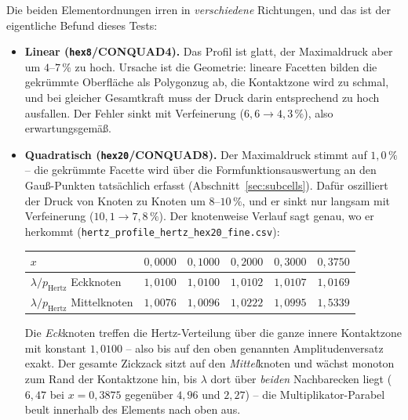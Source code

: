 \documentclass[a4paper,11pt]{article}
\newcommand{\code}[1]{\texttt{\small #1}}
\newcommand{\file}[1]{\texttt{\small #1}}
\begin{document}
\noindent Die beiden Elementordnungen irren in \emph{verschiedene} Richtungen, und das ist der
eigentliche Befund dieses Tests:

\begin{itemize}\itemsep2pt
  \item \textbf{Linear (\code{hex8}/CONQUAD4).} Das Profil ist glatt, der Maximaldruck aber um
        $4$--$7\,\%$ zu hoch. Ursache ist die Geometrie: lineare Facetten bilden die gekrümmte
        Oberfläche als Polygonzug ab, die Kontaktzone wird zu schmal, und bei gleicher Gesamtkraft
        muss der Druck darin entsprechend zu hoch ausfallen. Der Fehler sinkt mit Verfeinerung
        ($6{,}6\to4{,}3\,\%$), also erwartungsgemäß.
  \item \textbf{Quadratisch (\code{hex20}/CONQUAD8).} Der Maximaldruck stimmt auf $1{,}0\,\%$ --
        die gekrümmte Facette wird über die Formfunktionsauswertung an den Gauß-Punkten
        tatsächlich erfasst (Abschnitt~\ref{sec:subcells}). Dafür oszilliert der Druck von Knoten
        zu Knoten um $8$--$10\,\%$, und er sinkt nur langsam mit Verfeinerung
        ($10{,}1\to7{,}8\,\%$). Der knotenweise Verlauf sagt genau, wo er herkommt
        (\file{hertz\_profile\_hertz\_hex20\_fine.csv}):

        \begin{center}
        \small
        \begin{tabular}{lrrrrr}
        \toprule
        $x$ & $0{,}0000$ & $0{,}1000$ & $0{,}2000$ & $0{,}3000$ & $0{,}3750$ \\
        \midrule
        $\lambda/p_{\text{Hertz}}$ Eckknoten   & $1{,}0100$ & $1{,}0100$ & $1{,}0102$ & $1{,}0107$ & $1{,}0169$ \\
        $\lambda/p_{\text{Hertz}}$ Mittelknoten & $1{,}0076$ & $1{,}0096$ & $1{,}0222$ & $1{,}0995$ & $1{,}5339$ \\
        \bottomrule
        \end{tabular}
        \end{center}

        Die \emph{Eck}knoten treffen die Hertz-Verteilung über die ganze innere Kontaktzone mit
        konstant $1{,}0100$ -- also bis auf den oben genannten Amplitudenversatz exakt. Der
        gesamte Zickzack sitzt auf den \emph{Mittel}knoten und wächst monoton zum Rand der
        Kontaktzone hin, bis $\lambda$ dort über \emph{beiden} Nachbarecken liegt ($6{,}47$ bei
        $x=0{,}3875$ gegenüber $4{,}96$ und $2{,}27$) -- die Multiplikator-Parabel beult innerhalb
        des Elements nach oben aus.


\end{itemize}
\end{document}
